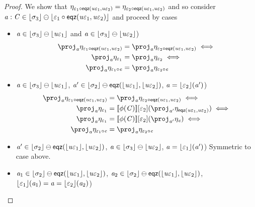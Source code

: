 \begin{proof}
    We show that $\eta_{\varepsilon_1 \circ \mathsf{eqz}(\mathit{u}\varepsilon_1, \mathit{u}\varepsilon_2)} = \eta_{\varepsilon_2 \circ \mathsf{eqz}(\mathit{u}\varepsilon_1, \mathit{u}\varepsilon_2)}$
    and so consider $\mathit{a} : \mathit{C} \in \lfloor\sigma_3\rfloor \ominus \lfloor\varepsilon_1 \circ \mathsf{eqz}(\mathit{u}\varepsilon_1, \mathit{u}\varepsilon_2)\rfloor$ and proceed by cases
    \begin{itemize}
        \item $\mathit{a} \in \lfloor\sigma_3\rfloor \ominus \lfloor\mathit{u}\varepsilon_1\rfloor$ and $\mathit{a} \in \lfloor\sigma_3\rfloor \ominus \lfloor\mathit{u}\varepsilon_2\rfloor$)
            \begin{align*}
                \proj_\va \mvarM_{\me_1 \comp \eqz{\tinstU\me_1}{\tinstU\me_2}} & = \proj_\va \mvarM_{\me_2 \comp \eqz{\tinstU\me_1}{\tinstU\me_2}} \iff \\
                \proj_\va \mvarM_{\me_1} & = \proj_\va \mvarM_{\me_2} \iff \\
                \proj_\va \mvarM_{\me_1 \comp \ve} & = \proj_\va \mvarM_{\me_2 \comp \ve}
            \end{align*}
        \item $\mathit{a} \in \lfloor\sigma_3\rfloor \ominus \lfloor\mathit{u}\varepsilon_1\rfloor$, $\mathit{a}' \in \lfloor\sigma_2\rfloor \ominus \mathsf{eqz}(\lfloor\mathit{u}\varepsilon_1\rfloor, \lfloor\mathit{u}\varepsilon_2\rfloor)$,
              $\mathit{a} = \lfloor\varepsilon_2\rfloor(\mathit{a}')$)
            \begin{align*}
                \proj_\va \mvarM_{\me_1 \comp \eqz{\tinstU\me_1}{\tinstU\me_2}} & = \proj_\va \mvarM_{\me_2 \comp \eqz{\tinstU\me_1}{\tinstU\me_2}} \iff \\
                \proj_\va \mvarM_{\me_1} & = \sem{\phi(\vC)}\anyL{\me_2}(\proj_{\va'} \mvarM_{\eqz{\tinstU\me_1}{\tinstU\me_2}}) \iff \\
                \proj_\va \mvarM_{\me_1} & = \sem{\phi(\vC)}\anyL{\me_2}(\proj_{\va'} \mvarM_\ve) \iff \\
                \proj_\va \mvarM_{\me_1 \comp \ve} & = \proj_{\va} \mvarM_{\me_2 \comp \ve}
            \end{align*}
        \item $\mathit{a}' \in \lfloor\sigma_2\rfloor \ominus \mathsf{eqz}(\lfloor\mathit{u}\varepsilon_1\rfloor, \lfloor\mathit{u}\varepsilon_2\rfloor)$,
              $\mathit{a} \in \lfloor\sigma_3\rfloor \ominus \lfloor\mathit{u}\varepsilon_2\rfloor$, $\mathit{a} = \lfloor\varepsilon_1\rfloor(\mathit{a}')$)
              Symmetric to case above.
        \item $\mathit{a}_1 \in \lfloor\sigma_2\rfloor \ominus \mathsf{eqz}(\lfloor\mathit{u}\varepsilon_1\rfloor, \lfloor\mathit{u}\varepsilon_2\rfloor)$,
              $\mathit{a}_2 \in \lfloor\sigma_2\rfloor \ominus \mathsf{eqz}(\lfloor\mathit{u}\varepsilon_1\rfloor, \lfloor\mathit{u}\varepsilon_2\rfloor)$,
              $\lfloor\varepsilon_1\rfloor(\mathit{a}_1) = \mathit{a} = \lfloor\varepsilon_2\rfloor(\mathit{a}_2)$)

\end{itemize}
\end{proof}
